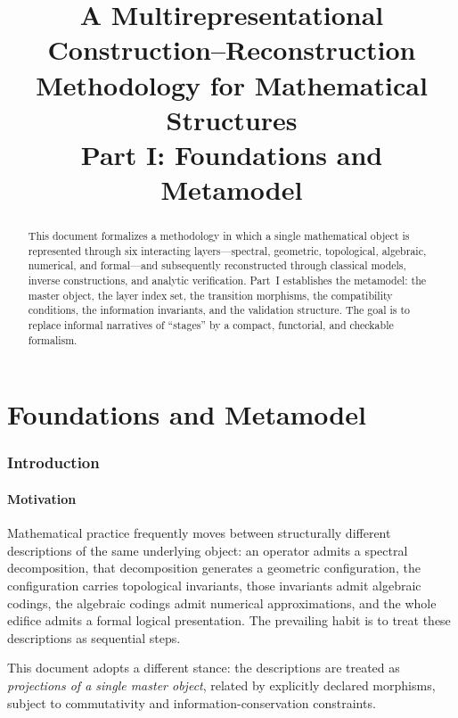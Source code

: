 \documentclass[11pt,a4paper]{article}
\title{%
  \textbf{A Multirepresentational Construction--Reconstruction\\
  Methodology for Mathematical Structures}\\[4pt]
  \large Part I: Foundations and Metamodel
}
\author{}
\date{}
\theoremstyle{definition}
\theoremstyle{plain}
\begin{document}
\maketitle

\begin{abstract}
\noindent
This document formalizes a methodology in which a single mathematical
object is represented through six interacting layers---spectral,
geometric, topological, algebraic, numerical, and formal---and
subsequently reconstructed through classical models, inverse
constructions, and analytic verification. Part~I establishes the
metamodel: the master object, the layer index set, the transition
morphisms, the compatibility conditions, the information invariants,
and the validation structure. The goal is to replace informal
narratives of ``stages'' by a compact, functorial, and checkable
formalism.
\end{abstract}

\tableofcontents

\part{Foundations and Metamodel}

\section{Introduction}

\subsection{Motivation}

Mathematical practice frequently moves between structurally different
descriptions of the same underlying object: an operator admits a
spectral decomposition, that decomposition generates a geometric
configuration, the configuration carries topological invariants,
those invariants admit algebraic codings, the algebraic codings admit
numerical approximations, and the whole edifice admits a formal
logical presentation. The prevailing habit is to treat these
descriptions as sequential steps.

This document adopts a different stance: the descriptions are treated
as \emph{projections of a single master object}, related by explicitly
declared morphisms, subject to commutativity and information-conservation
constraints.
\end{document}
